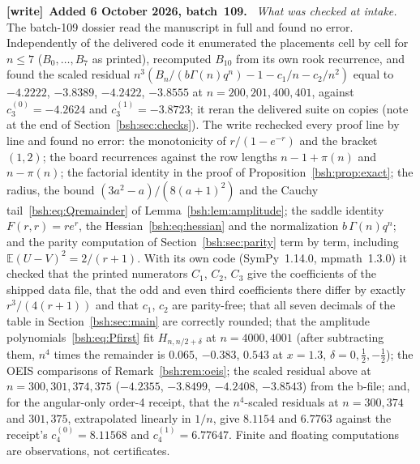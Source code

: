 \documentclass[11pt,letterpaper]{article}
\theoremstyle{remark}\newtheorem{remark}[theorem]{Remark}
\newcommand{\E}{\mathbb E}
\newenvironment{writenote}[1][]{\par\smallskip\begingroup\small
 \noindent\textbf{[write]}\if\relax\detokenize{#1}\relax\else~\textbf{#1.}\fi\ }%
 {\par\endgroup\smallskip}
\begin{document}
\begin{writenote}[Added 6 October 2026, batch~109]
\emph{What was checked at intake.} The batch-109 dossier read the manuscript
in full and found no error. Independently of the delivered code it
enumerated the placements cell by cell for $n\le7$ ($B_0,\dots,B_7$ as
printed), recomputed $B_{10}$ from its own rook recurrence, and found the
scaled residual $n^3(B_n/(b\Gamma(n)q^n)-1-c_1/n-c_2/n^2)$ equal to
$-4.2222$, $-3.8389$, $-4.2422$, $-3.8555$ at $n=200,201,400,401$, against
$c_3^{(0)}=-4.2624$ and $c_3^{(1)}=-3.8723$; it reran the delivered suite on
copies (note at the end of Section~\ref{bsh:sec:checks}). The write
rechecked every proof line by line and found no error: the monotonicity of
$r/(1-e^{-r})$ and the bracket $(1,2)$; the board recurrences against the
row lengths $n-1+\pi(n)$ and $n-\pi(n)$; the factorial identity in the
proof of Proposition~\ref{bsh:prop:exact}; the radius, the bound
$(3a^2-a)/(8(a+1)^2)$ and the Cauchy tail~\eqref{bsh:eq:Qremainder} of
Lemma~\ref{bsh:lem:amplitude}; the saddle identity $F(r,r)=re^r$, the
Hessian~\eqref{bsh:eq:hessian} and the normalization $b\,\Gamma(n)q^n$; and
the parity computation of Section~\ref{bsh:sec:parity} term by term,
including $\E(U-V)^2=2/(r+1)$. With its own code (SymPy~1.14.0, mpmath~1.3.0)
it checked that the printed numerators $C_1$, $C_2$, $C_3$ give the
coefficients of the shipped data file, that the odd and even third
coefficients there differ by exactly $r^3/(4(r+1))$ and that $c_1$, $c_2$
are parity-free; that all seven decimals of the table in
Section~\ref{bsh:sec:main} are correctly rounded; that the amplitude
polynomials~\eqref{bsh:eq:Pfirst} fit $H_{n,n/2+\delta}$ at $n=4000,4001$
(after subtracting them, $n^4$ times the remainder is $0.065$, $-0.383$,
$0.543$ at $x=1.3$, $\delta=0,\frac12,-\frac12$); the OEIS comparisons of
Remark~\ref{bsh:rem:oeis}; the scaled residual above at $n=300,301,374,375$
($-4.2355$, $-3.8499$, $-4.2408$, $-3.8543$) from the b-file; and, for the
angular-only order-4 receipt, that the $n^4$-scaled residuals at
$n=300,374$ and $301,375$, extrapolated linearly in $1/n$, give $8.1154$ and
$6.7763$ against the receipt's $c_4^{(0)}=8.11568$ and
$c_4^{(1)}=6.77647$. Finite and floating computations are observations,
not certificates.


\end{writenote}
\end{document}
